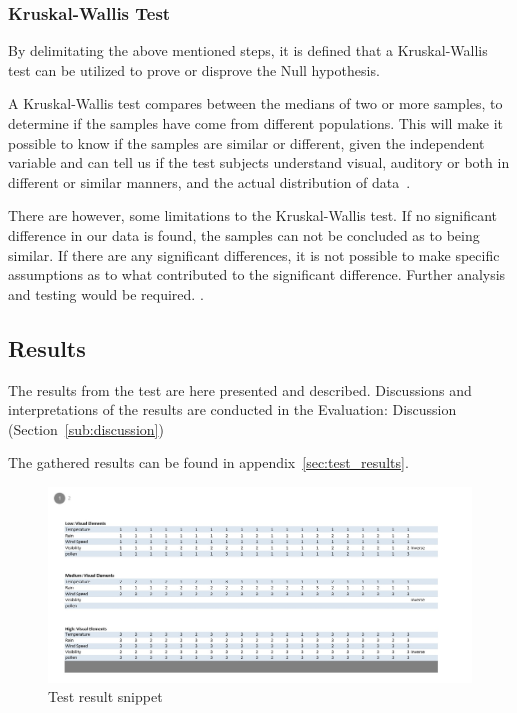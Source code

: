 \subsubsection{Kruskal-Wallis Test} %
\label{ssub:kruskal_wallis_test}

By delimitating the above mentioned steps, it is defined that a Kruskal-Wallis test can be utilized to prove or disprove the Null hypothesis.


A Kruskal-Wallis test compares between the medians of two or more samples, to determine if the samples have come from different populations. 
This will make it possible to know if the samples are similar or different, given the independent variable and can tell us if the test subjects understand visual, auditory or both in different or similar manners, and the actual distribution of data~\cite{Gaten2000}.


There are however, some limitations to the Kruskal-Wallis test.
If no significant difference in our data is found, the samples can not be concluded as to being similar.
If there are any significant differences, it is not possible to make specific assumptions as to what contributed to the significant difference. 
Further analysis and testing would be required. \cite*{Gaten2000}.





\subsection{Results} %
\label{sub:results}

The results from the test are here presented and described. 
Discussions and interpretations of the results are conducted in the Evaluation: Discussion (Section~\ref{sub:discussion})

The gathered results can be found in appendix~\ref{sec:test_results}.

\begin{figure}[!htbp]
    \centering
    \includegraphics[width=1\textwidth]{images/Evaluation1.jpg}
    \caption{Test result snippet}
    \label{fig:evaluation1}
\end{figure}

